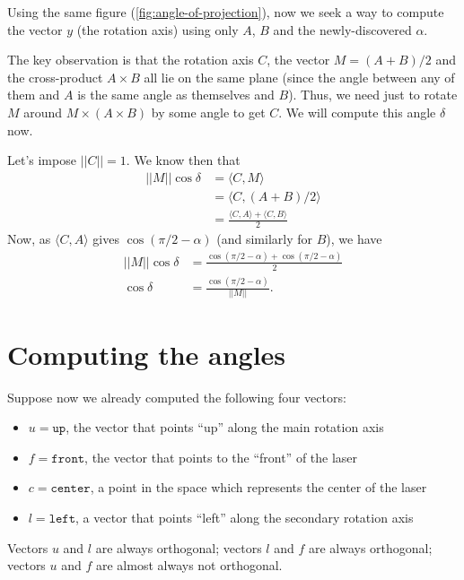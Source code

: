 \documentclass{article}
\begin{document}
Using the same figure (\ref{fig:angle-of-projection}),
now we seek a way to compute the vector $y$
(the rotation axis)
using only $A$, $B$ and the newly-discovered $\alpha$.

The key observation is that the rotation axis $C$,
the vector $M = (A + B)/2$ and the cross-product $A \times B$
all lie on the same plane
(since the angle between any of them and $A$ is the same angle as
themselves and $B$).
Thus, we need just to rotate $M$ around $M \times (A \times B)$
by some angle to get $C$.
We will compute this angle $\delta$ now.

Let's impose $||C|| = 1$.
We know then that
\begin{align*}
    ||M|| \cos \delta &= \langle C, M \rangle \\
                      &= \langle C, (A + B) / 2 \rangle \\
                      &= \frac{ \langle C, A \rangle + \langle C, B \rangle }{2}
\end{align*}
Now, as $\langle C, A \rangle$ gives $\cos( \pi/2 - \alpha )$
(and similarly for $B$),
we have
\begin{align*}
    ||M|| \cos \delta &= \frac{ \cos(\pi/2 - \alpha) + \cos(\pi/2 - \alpha)}{2} \\
    \cos \delta &= \frac{\cos(\pi/2 - \alpha)}{||M||}.
\end{align*}

\section{Computing the angles}

Suppose now we already computed the following four vectors:
\begin{itemize}
    \item $u = \texttt{up}$,
        the vector that points ``up'' along the main rotation axis
    \item $f = \texttt{front}$,
        the vector that points to the ``front'' of the laser
    \item $c = \texttt{center}$,
        a point in the space which represents the center of the laser
    \item $l = \texttt{left}$,
        a vector that points ``left'' along the secondary rotation axis
\end{itemize}

Vectors $u$ and $l$ are always orthogonal;
vectors $l$ and $f$ are always orthogonal;
vectors $u$ and $f$ are almost always not orthogonal.
\end{document}
